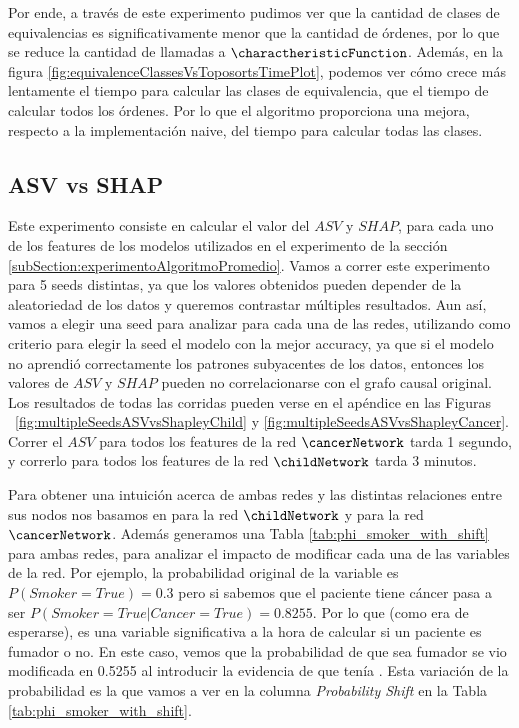 Por ende, a través de este experimento pudimos ver que la cantidad de clases de equivalencias es significativamente menor que la cantidad de órdenes, por lo que se reduce la cantidad de llamadas a $\charactheristicFunction$. Además, en la figura \ref{fig:equivalenceClassesVsToposortsTimePlot}, podemos ver cómo crece más lentamente el tiempo para calcular las clases de equivalencia, que el tiempo de calcular todos los órdenes. Por lo que el algoritmo proporciona una mejora, respecto a la implementación naive, del tiempo para calcular todas las clases.

\subsection{ASV vs SHAP}


Este experimento consiste en calcular el valor del $ASV$ y $SHAP$, para cada uno de los features de los modelos utilizados en el experimento de la sección \ref{subSection:experimentoAlgoritmoPromedio}. Vamos a correr este experimento para 5 seeds distintas, ya que los valores obtenidos pueden depender de la aleatoriedad de los datos y queremos contrastar múltiples resultados. Aun así, vamos a elegir una seed para analizar para cada una de las redes, utilizando como criterio para elegir la seed el modelo con la mejor accuracy, ya que si el modelo no aprendió correctamente los patrones subyacentes de los datos, entonces los valores de $ASV$ y $SHAP$ pueden no correlacionarse con el grafo causal original. Los resultados de todas las corridas pueden verse en el apéndice en las Figuras ~\ref{fig:multipleSeedsASVvsShapleyChild} y \ref{fig:multipleSeedsASVvsShapleyCancer}. Correr el $ASV$ para todos los features de la red $\cancerNetwork$ tarda 1 segundo, y correrlo para todos los features de la red $\childNetwork$ tarda 3 minutos. 

Para obtener una intuición acerca de ambas redes y las distintas relaciones entre sus nodos nos basamos en \cite{childNetwork} para la red $\childNetwork$ y \cite{cancerNetwork} para la red $\cancerNetwork$. Además generamos una Tabla \ref{tab:phi_smoker_with_shift} para ambas redes, para analizar el impacto de modificar cada una de las variables de la red. Por ejemplo, la probabilidad original de la variable  es $P(Smoker=True)=0.3$ pero si sabemos que el paciente tiene cáncer pasa a ser $P(Smoker=True|Cancer=True)=0.8255$. Por lo que (como era de esperarse),  es una variable significativa a la hora de calcular si un paciente es fumador o no. En este caso, vemos que la probabilidad de que sea fumador se vio modificada en 0.5255 al introducir la evidencia de que tenía . Esta variación de la probabilidad es la que vamos a ver en la columna \emph{Probability Shift} en la Tabla \ref{tab:phi_smoker_with_shift}.


